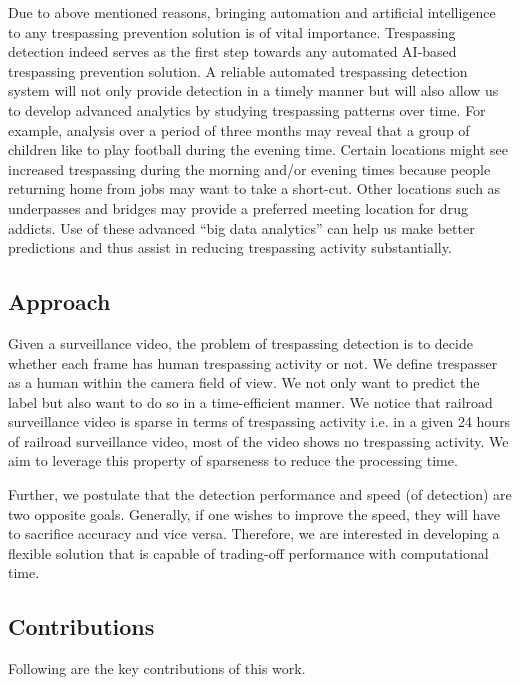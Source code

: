 Due to above mentioned reasons, bringing automation and artificial intelligence to any trespassing prevention solution is of vital importance. Trespassing detection indeed serves as the first step towards any automated AI-based trespassing prevention solution. A reliable automated trespassing detection system will not only provide detection in a timely manner but will also allow us to develop advanced analytics by studying trespassing patterns over time. For example, analysis over a period of three months may reveal that a group of children like to play football during the evening time. Certain locations might see increased trespassing during the morning and/or evening times because people returning home from jobs may want to take a short-cut. Other locations such as underpasses and bridges may provide a preferred meeting location for drug addicts. Use of these advanced ``big data analytics'' can help us make better predictions and thus assist in  reducing trespassing activity substantially.

\subsection{Approach} 
\label{sec:goal}
Given a surveillance video, the problem of trespassing detection is to decide whether each frame has human trespassing activity or not. We define trespasser as a human within the camera field of view. We not only want to predict the label but also want to do so in a time-efficient manner. We notice that railroad surveillance video is sparse in terms of trespassing activity i.e. in a given 24 hours of railroad surveillance video, most of the video shows no trespassing activity. We aim to leverage this property of sparseness to reduce the processing time. 

Further, we postulate that the detection performance and speed (of detection) are two opposite goals. Generally, if one wishes to improve the speed, they will have to sacrifice accuracy and vice versa. Therefore, we are interested in developing a  flexible solution that is capable of trading-off performance with computational time.

\subsection{Contributions}
Following are the key contributions of this work. 

